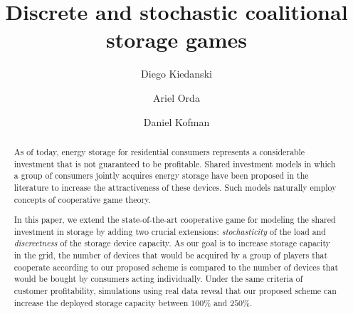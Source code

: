 \documentclass[sigconf, table]{acmart}
\begin{document}
\title{Discrete and stochastic coalitional storage games}

\author{Diego Kiedanski}

\author{Ariel Orda}


\author{Daniel Kofman}
\renewcommand{\shortauthors}{D. Kiedanski, A. Orda, D. Kofman.}

\begin{abstract}


As of today, energy storage for residential consumers represents a considerable investment that is not guaranteed to be profitable. Shared investment models in which a group of consumers jointly acquires energy storage have been proposed in the literature to increase the attractiveness of these devices. Such models naturally employ concepts of cooperative game theory.

In this paper, we extend the state-of-the-art cooperative game for modeling the shared investment in storage by adding two crucial extensions: {\em stochasticity} of the load and {\em discreetness} of the storage device capacity.
As our goal is to increase storage capacity in the grid, the number of devices that would be acquired by a group of players that cooperate according to our proposed scheme is compared to the number of devices that would be bought by consumers acting individually. 
Under the same criteria of customer profitability,
simulations using real data reveal that our proposed scheme can increase the deployed storage capacity between $100\%$ and $250\%$.
\end{abstract}
\end{document}
